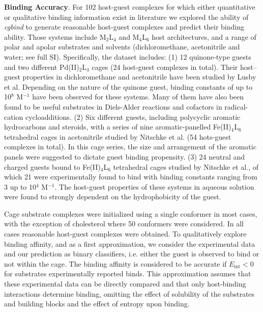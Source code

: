 \documentclass[../../main.tex]{subfiles}
\newcommand{\cgbind}{\emph{cgbind }}
\newcommand{\MLf}{M$_2$L$_4$ }
\newcommand{\MLs}{M$_4$L$_6$ }
\begin{document}
{\bfseries{Binding Accuracy}}. For 102 host-guest complexes for which either quantitative or qualitative binding information exist in literature we explored the ability of \cgbind to generate reasonable host-guest complexes and predict their binding ability. Those systems include \MLf and \MLs host architectures, and a range of polar and apolar substrates and solvents (dichloromethane, acetonitrile and water; see full SI). Specifically, the dataset includes: (1) 12 quinone‐type guests and two different Pd(II)$_2$L$_4$ cages (24 host-guest complexes in total). Their host–guest properties in dichloromethane and acetonitrile have been studied by Lusby et al.\cite{August2016} Depending on the nature of the quinone guest, binding constants of up to 10$^8$ M${}^{-1}$ have been observed for these systems. Many of them have also been found to be useful substrates in Diels-Alder reactions and cofactors in radical-cation cycloadditions.\cite{MartCentelles2018, Spicer2020} (2)	Six different guests, including polycyclic aromatic hydrocarbons and steroids, with a series of nine aromatic-panelled Fe(II)$_4$L$_6$ tetrahedral cages in acetonitrile studied by Nitschke et al. (54 hots-guest complexes in total).\cite{Ronson2017} In this cage series, the size and arrangement of the aromatic panels were suggested to dictate guest binding propensity. 
(3)	24 neutral and charged guests bound to Fe(II)$_4$L$_6$  tetrahedral cages studied by Nitschke et al.,\cite{Smulders2013} of which 21 were experimentally found to bind with binding constants ranging from 3 up to 10$^4$ M$^{-1}$. The host-guest properties of these systems in aqueous solution were found to strongly dependent on the hydrophobicity of the guest.

Cage substrate complexes were initialized using a single conformer in most cases, with the exception of cholesterol where 50 conformers were considered. In all cases reasonable host-guest complexes were obtained. To qualitatively explore binding affinity, and as a first approximation, we consider the experimental data and our prediction as binary classifiers, i.e. either the guest is observed to bind or not within the cage. The binding affinity is considered to be accurate if $E_\text{int} < 0$ for substrates experimentally reported binds. This approximation assumes that these experimental data can be directly compared and that only host-binding interactions determine binding, omitting the effect of solubility of the substrates and building blocks and the effect of entropy upon binding. 
\end{document}
